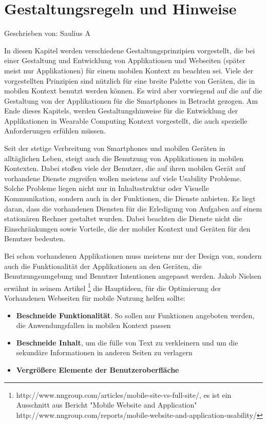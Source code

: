 
\section{Gestaltungsregeln und Hinweise}

Geschrieben von: Saulius A

In diesen Kapitel werden verschiedene Gestaltungsprinzipien vorgestellt, die bei einer Gestaltung und Entwicklung von Applikationen und Webseiten (später meist nur Applikationen) für einem mobilen Kontext zu beachten sei. Viele der vorgestellten Prinzipien sind nützlich für eine breite Palette von Geräten, die in mobilen Kontext benutzt werden können. Es wird aber vorwiegend auf die auf die Gestaltung von der Applikationen für die Smartphones in Betracht gezogen. Am Ende dieses Kapitels, werden Gestaltungshinweise für die Entwicklung der Applikationen in Wearable Computing Kontext vorgestellt, die auch spezielle Anforderungen erfühlen müssen.

Seit der stetige Verbreitung von Smartphones und mobilen Geräten in alltäglichen Leben, steigt auch die Benutzung von Applikationen in mobilen Kontexten. Dabei stoßen viele der Benutzer, die auf ihren mobilen Gerät auf vorhandene Dienste zugreifen wollen meistens auf viele Usability Probleme. Solche Probleme liegen nicht nur in Inhaltsstruktur oder Visuelle Kommunikation, sondern auch in der Funktionen, die Dienste anbieten. Es liegt daran, dass die vorhandenen Diensten für die Erledigung von Aufgaben auf einem stationären Rechner gestaltet wurden. Dabei beachten die Dienste nicht die Einschränkungen sowie Vorteile, die der mobiler Kontext und Geräten für den Benutzer bedeuten.

Bei schon vorhandenen Applikationen muss meistens nur der Design von, sondern auch die Funktionalität der Applikationen an den Geräten, die Benutzungsumgebung und Benutzer Intentionen angepasst werden. Jakob Nielsen erwähnt in seinem Artikel \footnote{http://www.nngroup.com/articles/mobile-site-vs-full-site/, es ist ein Ausschnitt aus Bericht "Mobile Website and Application" http://www.nngroup.com/reports/mobile-website-and-application-usability/} die Hauptideen, für die Optimierung der Vorhandenen Webseiten für mobile Nutzung helfen sollte:
\begin{itemize}
	\item \textbf{Beschneide Funktionalität}. So sollen nur Funktionen angeboten werden, die Anwendungsfallen in  mobilen Kontext passen
	\item \textbf{Beschneide Inhalt}, um die fülle von Text zu verkleinern und um die sekundäre Informationen in anderen Seiten zu verlagern
	\item \textbf{Vergrößere Elemente der Benutzeroberfläche}
\end{itemize}

